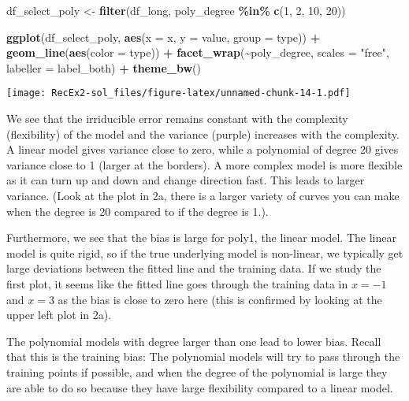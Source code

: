 \documentclass[
]{article}
\newenvironment{Shaded}{\begin{snugshade}}{\end{snugshade}}
\newcommand{\AttributeTok}[1]{\textcolor[rgb]{0.13,0.29,0.53}{#1}}
\newcommand{\DecValTok}[1]{\textcolor[rgb]{0.00,0.00,0.81}{#1}}
\newcommand{\FunctionTok}[1]{\textcolor[rgb]{0.13,0.29,0.53}{\textbf{#1}}}
\newcommand{\NormalTok}[1]{#1}
\newcommand{\OtherTok}[1]{\textcolor[rgb]{0.56,0.35,0.01}{#1}}
\newcommand{\SpecialCharTok}[1]{\textcolor[rgb]{0.81,0.36,0.00}{\textbf{#1}}}
\newcommand{\StringTok}[1]{\textcolor[rgb]{0.31,0.60,0.02}{#1}}
\begin{document}
\begin{Shaded}
\begin{Highlighting}[]
\NormalTok{df\_select\_poly }\OtherTok{\textless{}{-}} \FunctionTok{filter}\NormalTok{(df\_long, poly\_degree }\SpecialCharTok{\%in\%} \FunctionTok{c}\NormalTok{(}\DecValTok{1}\NormalTok{, }\DecValTok{2}\NormalTok{, }\DecValTok{10}\NormalTok{, }\DecValTok{20}\NormalTok{))}

\FunctionTok{ggplot}\NormalTok{(df\_select\_poly, }\FunctionTok{aes}\NormalTok{(}\AttributeTok{x =}\NormalTok{ x, }\AttributeTok{y =}\NormalTok{ value, }\AttributeTok{group =}\NormalTok{ type)) }\SpecialCharTok{+}
  \FunctionTok{geom\_line}\NormalTok{(}\FunctionTok{aes}\NormalTok{(}\AttributeTok{color =}\NormalTok{ type)) }\SpecialCharTok{+}
  \FunctionTok{facet\_wrap}\NormalTok{(}\SpecialCharTok{\textasciitilde{}}\NormalTok{poly\_degree, }\AttributeTok{scales =} \StringTok{"free"}\NormalTok{, }\AttributeTok{labeller =}\NormalTok{ label\_both) }\SpecialCharTok{+}
  \FunctionTok{theme\_bw}\NormalTok{()}
\end{Highlighting}
\end{Shaded}

\texttt{[image: RecEx2-sol\_files/figure-latex/unnamed-chunk-14-1.pdf]}

We see that the irriducible error remains constant with the complexity
(flexibility) of the model and the variance (purple) increases with the
complexity. A linear model gives variance close to zero, while a
polynomial of degree 20 gives variance close to 1 (larger at the
borders). A more complex model is more flexible as it can turn up and
down and change direction fast. This leads to larger variance. (Look at
the plot in 2a, there is a larger variety of curves you can make when
the degree is 20 compared to if the degree is 1.).

Furthermore, we see that the bias is large for poly1, the linear model.
The linear model is quite rigid, so if the true underlying model is
non-linear, we typically get large deviations between the fitted line
and the training data. If we study the first plot, it seems like the
fitted line goes through the training data in \(x=-1\) and \(x=3\) as
the bias is close to zero here (this is confirmed by looking at the
upper left plot in 2a).

The polynomial models with degree larger than one lead to lower bias.
Recall that this is the training bias: The polynomial models will try to
pass through the training points if possible, and when the degree of the
polynomial is large they are able to do so because they have large
flexibility compared to a linear model.
\end{document}
